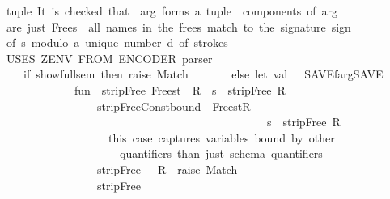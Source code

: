 \begin{isabellebody}
\ \ \ tuple{\isachardot}\ It\ is\ checked\ that\ {}{\isachardot}\ arg\ forms\ a\ tuple{\isacharcomma}\ {}{\isachardot}\ components\ of\ arg\isanewline
\ \ \ are\ just\ Free{\isacharprime}s{\isacharcomma}\ {}{\isachardot}\ all\ names\ in\ the\ free{\isacharprime}s\ match\ to\ the\ signature\ sign\isanewline
\ \ \ of\ s\ modulo\ a\ unique\ number\ d\ of\ strokes\ {\isacharprime}{\isachardot}\ \ \isanewline
\ \ \ \isanewline
\ \ \ USES\ ZENV\ FROM\ ENCODER\ {\isacharparenleft}parser\ {\isachardot}\ {\isachardot}\ {\isachardot}{\isacharparenright}\isanewline
\ \ \ {\isacharasterisk}{\isacharparenright}\isanewline
\ \ \ \ \ \ if\ {\isacharbang}show{\isacharunderscore}full{\isacharunderscore}sem\ then\ raise\ Match\ \isanewline
\ \ \ \ \ \ else\ {\isacharparenleft}let\ val\ {\isacharunderscore}\ {\isacharequal}\ {\isacharparenleft}SAVE{\isacharcolon}{\isacharequal}{\isacharbrackleft}f{\isacharcomma}arg{\isacharbrackright}{\isacharat}{\isacharparenleft}{\isacharbang}SAVE{\isacharparenright}{\isacharparenright}\ \isanewline
\ \ \ \ \ \ \ \ \ \ \ \ \ \ \ fun\ \ stripFree\ {\isacharparenleft}Free{\isacharparenleft}s{\isacharcomma}t{\isacharparenright}\ {\isacharcolon}{\isacharcolon}\ R{\isacharparenright}\ {\isacharequal}\ s\ {\isacharcolon}{\isacharcolon}\ {\isacharparenleft}stripFree\ R{\isacharparenright}\isanewline
\ \ \ \ \ \ \ \ \ \ \ \ \ \ \ \ \ \ {\isacharbar}\ stripFree{\isacharparenleft}{\isacharparenleft}Const{\isacharparenleft}{\isachardoublequote}{\isacharunderscore}bound{\isachardoublequote}{\isacharcomma}{\isacharunderscore}{\isacharparenright}\ {\isachardollar}\ Free{\isacharparenleft}s{\isacharcomma}t{\isacharparenright}{\isacharparenright}{\isacharcolon}{\isacharcolon}R{\isacharparenright}\ {\isacharequal}\ \isanewline
\ \ \ \ \ \ \ \ \ \ \ \ \ \ \ \ \ \ \ \ \ \ \ \ \ \ \ \ \ \ \ \ \ \ \ \ \ \ \ \ \ \ \ \ \ \ \ \ \ s\ {\isacharcolon}{\isacharcolon}\ {\isacharparenleft}stripFree\ R{\isacharparenright}\isanewline
\ \ \ \ \ \ \ \ \ \ \ \ \ \ \ \ \ \ \ \ {\isacharparenleft}{\isacharasterisk}\ this\ case\ captures\ variables\ bound\ by\ other\isanewline
\ \ \ \ \ \ \ \ \ \ \ \ \ \ \ \ \ \ \ \ \ \ \ quantifiers\ than\ just\ schema\ quantifiers\ {\isachardot}{\isachardot}{\isachardot}{\isacharasterisk}{\isacharparenright}\isanewline
\ \ \ \ \ \ \ \ \ \ \ \ \ \ \ \ \ \ {\isacharbar}\ stripFree\ {\isacharparenleft}{\isacharunderscore}\ {\isacharcolon}{\isacharcolon}\ R{\isacharparenright}\ {\isacharequal}\ raise\ Match\isanewline
\ \ \ \ \ \ \ \ \ \ \ \ \ \ \ \ \ \ {\isacharbar}\ stripFree\ {\isacharbrackleft}{\isacharbrackright}\ \ \ \ \ {\isacharequal}\ {\isacharbrackleft}{\isacharbrackright}{\isacharsemicolon}\isanewline

\end{isabellebody}
